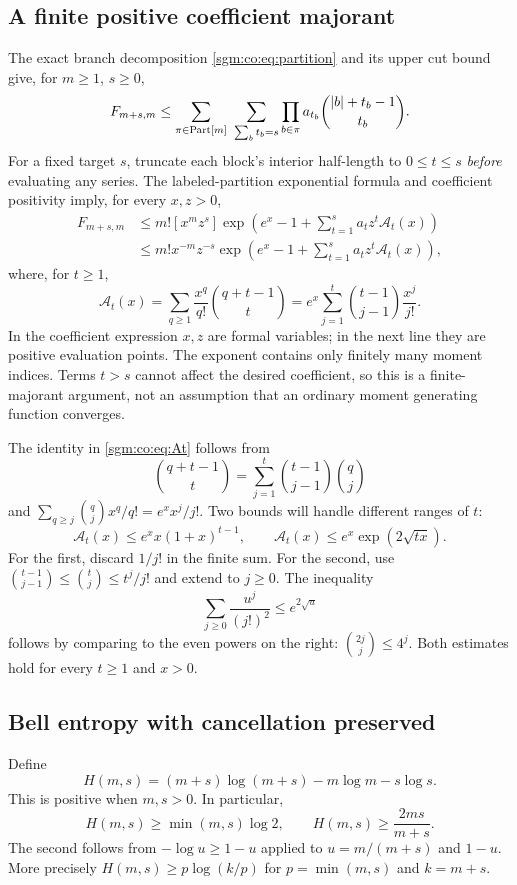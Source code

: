 \documentclass[11pt,letterpaper]{article}
\theoremstyle{remark}\newtheorem{remark}[theorem]{Remark}
\theoremstyle{definition}\newtheorem{definition}[theorem]{Definition}
\begin{document}
\subsection{A finite positive coefficient majorant}\label{sgm:co:sec:majorant}
The exact branch decomposition \eqref{sgm:co:eq:partition} and its upper cut bound give, for $m\ge1$, $s\ge0$,
\[
 F_{m+s,m}\le\sum_{\pi\in\Part[m]}\ \sum_{\sum_b t_b=s}
       \prod_{b\in\pi}a_{t_b}\binom{|b|+t_b-1}{t_b}.
\]
For a fixed target $s$, truncate each block's interior half-length to $0\le t\le s$ \emph{before} evaluating any series. The labeled-partition exponential formula and coefficient positivity imply, for every $x,z>0$,
\begin{align}
 F_{m+s,m}
 &\le m![x^mz^s]\exp\left(e^x-1+\sum_{t=1}^s a_tz^t\mathcal A_t(x)\right)\label{sgm:co:eq:coeffmajorant}\\
 &\le m!x^{-m}z^{-s}\exp\left(e^x-1+\sum_{t=1}^s a_tz^t\mathcal A_t(x)\right),\label{sgm:co:eq:cauchy}
\end{align}
where, for $t\ge1$,
\begin{equation}\label{sgm:co:eq:At}
 \mathcal A_t(x)=\sum_{q\ge1}\frac{x^q}{q!}\binom{q+t-1}{t}
       =e^x\sum_{j=1}^t\binom{t-1}{j-1}\frac{x^j}{j!}.
\end{equation}
In the coefficient expression $x,z$ are formal variables; in the next line they are positive evaluation points. The exponent contains only finitely many moment indices. Terms $t>s$ cannot affect the desired coefficient, so this is a finite-majorant argument, not an assumption that an ordinary moment generating function converges.

The identity in \eqref{sgm:co:eq:At} follows from
\[
 \binom{q+t-1}{t}=\sum_{j=1}^t\binom{t-1}{j-1}\binom qj
\]
and $\sum_{q\ge j}\binom qj x^q/q!=e^xx^j/j!$. Two bounds will handle different ranges of $t$:
\begin{equation}\label{sgm:co:eq:Atbounds}
 \mathcal A_t(x)\le e^xx(1+x)^{t-1},\qquad
 \mathcal A_t(x)\le e^x\exp(2\sqrt{tx}).
\end{equation}
For the first, discard $1/j!$ in the finite sum. For the second, use
$\binom{t-1}{j-1}\le\binom tj\le t^j/j!$ and extend to $j\ge0$. The inequality
\[
 \sum_{j\ge0}\frac{u^j}{(j!)^2}\le e^{2\sqrt u}
\]
follows by comparing to the even powers on the right: $\binom{2j}{j}\le4^j$. Both estimates hold for every $t\ge1$ and $x>0$.

\subsection{Bell entropy with cancellation preserved}\label{sgm:co:sec:entropy}
Define
\[
 H(m,s)=(m+s)\log(m+s)-m\log m-s\log s.
\]
This is positive when $m,s>0$. In particular,
\begin{equation}\label{sgm:co:eq:Hlower}
 H(m,s)\ge\min(m,s)\log2,\qquad H(m,s)\ge\frac{2ms}{m+s}.
\end{equation}
The second follows from $-\log u\ge1-u$ applied to $u=m/(m+s)$ and $1-u$. More precisely $H(m,s)\ge p\log(k/p)$ for $p=\min(m,s)$ and $k=m+s$.
\end{document}
